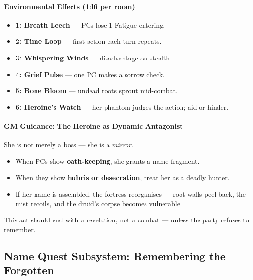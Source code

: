 \documentclass[11pt]{article}
\begin{document}
\bigskip

\paragraph{Environmental Effects (1d6 per room)}

\begin{itemize}
  \item \textbf{1: Breath Leech} --- PCs lose 1 Fatigue entering.
  \item \textbf{2: Time Loop} --- first action each turn repeats.
  \item \textbf{3: Whispering Winds} --- disadvantage on stealth.
  \item \textbf{4: Grief Pulse} --- one PC makes a sorrow check.
  \item \textbf{5: Bone Bloom} --- undead roots sprout mid-combat.
  \item \textbf{6: Heroine's Watch} --- her phantom judges the action; aid or hinder.
\end{itemize}

\bigskip

\paragraph{GM Guidance: The Heroine as Dynamic Antagonist}

She is not merely a boss --- she is a \emph{mirror}.

\begin{itemize}
  \item When PCs show \textbf{oath-keeping}, she grants a name fragment.
  \item When they show \textbf{hubris or desecration}, treat her as a deadly hunter.
  \item If her name is assembled, the fortress reorganises ---  
  root-walls peel back, the mist recoils, and the druid's corpse becomes vulnerable.
\end{itemize}

\noindent
This act should end with a revelation, not a combat --- unless the party refuses to remember.


\subsection{Name Quest Subsystem: Remembering the Forgotten}
\label{subsec:name_quest}
\end{document}
